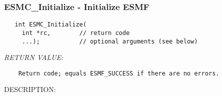  
\setlength{\oldparskip}{\parskip}
\setlength{\parskip}{1.5ex}
\setlength{\oldparindent}{\parindent}
\setlength{\parindent}{0pt}
\setlength{\oldbaselineskip}{\baselineskip}
\setlength{\baselineskip}{11pt}
 
\def\bv{\begin{verbatim}}
\def\ev{\end{verbatim}}
\def\be{\begin{equation}}
\def\ee{\end{equation}}
\def\bea{\begin{eqnarray}}
\def\eea{\end{eqnarray}}
\def\bi{\begin{itemize}}
\def\ei{\end{itemize}}
\def\bn{\begin{enumerate}}
\def\en{\end{enumerate}}
\def\bd{\begin{description}}
\def\ed{\end{description}}
\def\({\left (}
\def\){\right )}
\def\[{\left [}
\def\]{\right ]}
\def\<{\left  \langle}
\def\>{\right \rangle}
\def\cI{{\cal I}}
\def\diag{\mathop{\rm diag}}
\def\tr{\mathop{\rm tr}}


 
\subsubsection [ESMC\_Initialize] {ESMC\_Initialize - Initialize ESMF}


  
\begin{verbatim}   int ESMC_Initialize(
     int *rc,        // return code
     ...);           // optional arguments (see below)
 \end{verbatim}{\em RETURN VALUE:}
\begin{verbatim}    Return code; equals ESMF_SUCCESS if there are no errors.\end{verbatim}
{\sf DESCRIPTION:\\ }


